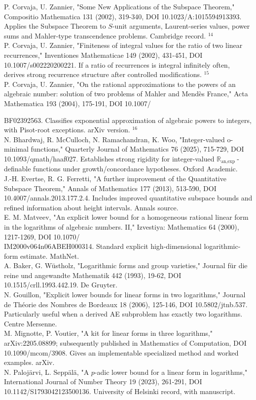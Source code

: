 \documentclass[10pt]{article}
\begin{document}
P. Corvaja, U. Zannier, "Some New Applications of the Subspace Theorem," Compositio Mathematica 131 (2002), 319-340, DOI 10.1023/A:1015594913393. Applies the Subspace Theorem to $S$-unit arguments, Laurent-series values, power sums and Mahler-type transcendence problems. Cambridge record. ${ }^{14}$\\
P. Corvaja, U. Zannier, "Finiteness of integral values for the ratio of two linear recurrences," Inventiones Mathematicae 149 (2002), 431-451, DOI 10.1007/s002220200221. If a ratio of recurrences is integral infinitely often, derives strong recurrence structure after controlled modifications. ${ }^{15}$\\
P. Corvaja, U. Zannier, "On the rational approximations to the powers of an algebraic number: solution of two problems of Mahler and Mendès France," Acta Mathematica 193 (2004), 175-191, DOI 10.1007/

BF02392563. Classifies exponential approximation of algebraic powers to integers, with Pisot-root exceptions. arXiv version. ${ }^{16}$\\
N. Bhardwaj, R. McCulloch, N. Ramachandran, K. Woo, "Integer-valued o-minimal functions," Quarterly Journal of Mathematics 76 (2025), 715-729, DOI 10.1093/qmath/haaf027. Establishes strong rigidity for integer-valued $\mathbb{R}_{\text {an,exp }}$-definable functions under growth/concordance hypotheses. Oxford Academic.\\
J.-H. Evertse, R. G. Ferretti, "A further improvement of the Quantitative Subspace Theorem," Annals of Mathematics 177 (2013), 513-590, DOI 10.4007/annals.2013.177.2.4. Includes improved quantitative subspace bounds and refined information about height intervals. Annals source.\\
E. M. Matveev, "An explicit lower bound for a homogeneous rational linear form in the logarithms of algebraic numbers. II," Izvestiya: Mathematics 64 (2000), 1217-1269, DOI 10.1070/\\
IM2000v064n06ABEH000314. Standard explicit high-dimensional logarithmic-form estimate. MathNet.\\
A. Baker, G. Wüstholz, "Logarithmic forms and group varieties," Journal für die reine und angewandte Mathematik 442 (1993), 19-62, DOI 10.1515/crll.1993.442.19. De Gruyter.\\
N. Gouillon, "Explicit lower bounds for linear forms in two logarithms," Journal de Théorie des Nombres de Bordeaux 18 (2006), 125-146, DOI 10.5802/jtnb.537. Particularly useful when a derived AE subproblem has exactly two logarithms. Centre Mersenne.\\
M. Mignotte, P. Voutier, "A kit for linear forms in three logarithms," arXiv:2205.08899; subsequently published in Mathematics of Computation, DOI 10.1090/mcom/3908. Gives an implementable specialized method and worked examples. arXiv.\\
N. Palojärvi, L. Seppälä, "A $p$-adic lower bound for a linear form in logarithms," International Journal of Number Theory 19 (2023), 261-291, DOI 10.1142/S1793042123500136. University of Helsinki record, with manuscript.
\end{document}
